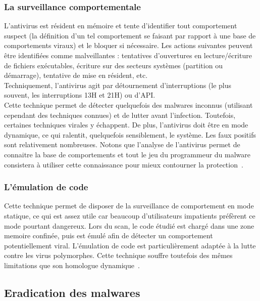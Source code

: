 \subsubsection{La surveillance comportementale}
L'antivirus est résident en mémoire et tente d'identifier tout comportement suspect (la définition d'un tel comportement se faisant par rapport à une base de comportements viraux) et le bloquer si nécessaire.
Les actions suivantes peuvent être identifiées comme malveillantes : tentatives d'ouvertures en lecture/écriture de fichiers exécutables, écriture sur des secteurs systèmes (partition ou démarrage), tentative de mise en résident, etc.\\
Techniquement, l'antivirus agit par détournement d'interruptions (le plus souvent, les interruptions 13H et 21H) ou d'API.\\
Cette technique permet de détecter quelquefois des malwares inconnus (utilisant cependant des techniques connues) et de lutter avant l'infection. Toutefois, certaines techniques virales y échappent. De plus, l'antivirus doit être en mode dynamique, ce qui ralentit, quelquefois sensiblement, le système. Les faux positifs sont relativement nombreuses. Notons que l'analyse de l'antivirus permet de connaitre la base de comportements et tout le jeu du
programmeur du malware consistera à utiliser cette connaissance pour mieux contourner la protection~\cite{anti}.


\subsubsection{L'émulation de code}
Cette technique permet de disposer de la surveillance de comportement en mode statique, ce qui est assez utile car beaucoup d'utilisateurs impatients préfèrent ce mode pourtant dangereux. Lors du scan, le code étudié est chargé dans une zone memoire confinée, puis est émulé afin de détecter un comportement potentiellement viral. L'émulation de code est particulièrement
adaptée à la lutte contre les virus polymorphes. Cette technique souffre toutefois des mêmes limitations que son homologue dynamique~\cite{anti}.
\subsection{Eradication des malwares}
